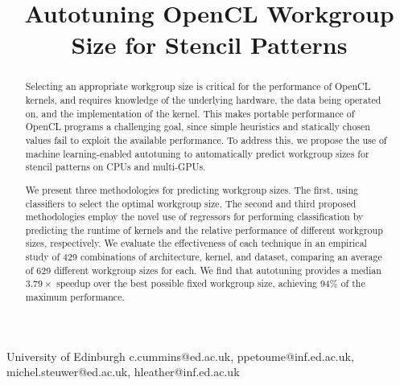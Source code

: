 \documentclass[preprint,nonatbib,10pt]{sigplanconf}
\begin{document}
\setlength{\pdfpageheight}{\paperheight}
\setlength{\pdfpagewidth}{\paperwidth}






\title{Autotuning OpenCL Workgroup Size for Stencil Patterns}


           {University of Edinburgh}
           {c.cummins@ed.ac.uk, ppetoume@inf.ed.ac.uk, michel.steuwer@ed.ac.uk, hleather@inf.ed.ac.uk}

\maketitle

\begin{abstract}
  Selecting an appropriate workgroup size is critical for the
  performance of OpenCL kernels, and requires knowledge of the
  underlying hardware, the data being operated on, and the
  implementation of the kernel. This makes portable performance of
  OpenCL programs a challenging goal, since simple heuristics and
  statically chosen values fail to exploit the available
  performance. To address this, we propose the use of machine
  learning-enabled autotuning to automatically predict workgroup sizes
  for stencil patterns on CPUs and multi-GPUs.

  We present three methodologies for predicting workgroup sizes. The
  first, using classifiers to select the optimal workgroup size. The
  second and third proposed methodologies employ the novel use of
  regressors for performing classification by predicting the runtime
  of kernels and the relative performance of different workgroup
  sizes, respectively. We evaluate the effectiveness of each technique
  in an empirical study of 429 combinations of architecture, kernel,
  and dataset, comparing an average of 629 different workgroup sizes
  for each. We find that autotuning provides a median $3.79\times$
  speedup over the best possible fixed workgroup size, achieving 94\%
  of the maximum performance.
\end{abstract}
\end{document}
